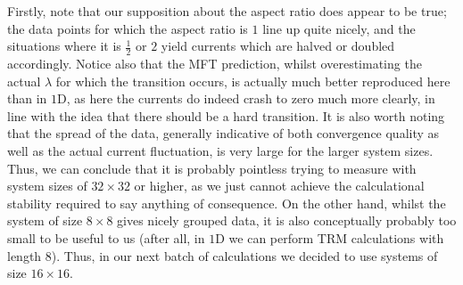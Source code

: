 Firstly, note that our supposition about the aspect ratio does appear to be true; the
data points for which the aspect ratio is $1$ line up quite nicely, and the situations
where it is $\frac{1}{2}$ or $2$ yield currents which are halved or doubled accordingly.
Notice also that the MFT prediction, whilst overestimating the actual $\lambda$ for 
which the transition occurs, is actually much better reproduced here than in $1$D, as here the
currents do indeed crash to zero much more clearly, in line with the idea that there should be a 
hard transition. It is also worth noting that the spread of the data, generally indicative
of both convergence quality as well as the actual current fluctuation, is very large for the 
larger system sizes. Thus, we can conclude that it is probably pointless trying to measure with
system sizes of $32\times 32$ or higher, as we just cannot achieve the calculational stability
required to say anything of consequence. On the other hand, whilst the system of size $8 \times 8$
gives nicely grouped data, it is also conceptually probably too small to be useful
to us (after all, in $1$D we can perform TRM calculations with length $8$). Thus, in our
next batch of calculations we decided to use systems of size $16 \times 16$.


